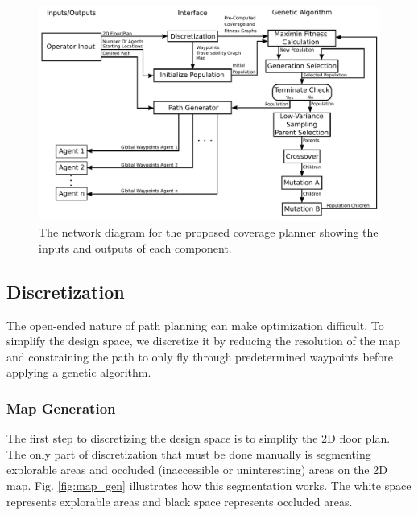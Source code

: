 \documentclass[letterpaper, 10 pt, conference]{ieeeconf}  %
\begin{document}
\begin{figure}
\centering
\includegraphics[width=0.8\linewidth]{coverage_planner_network.pdf}
\caption[The network diagram for the coverage path planner.]{The network diagram for the proposed coverage planner showing the inputs and outputs of each component.}
\label{fig:network}
\end{figure}

\subsection{Discretization}

The open-ended nature of path planning can make optimization difficult. To simplify the design space, we discretize it by reducing the resolution of the map and constraining the path to only fly through predetermined waypoints before applying a genetic algorithm.

\subsubsection{Map Generation}

The first step to discretizing the design space is to simplify the 2D floor plan. The only part of discretization that must be done manually is segmenting explorable areas and occluded (inaccessible or uninteresting) areas on the 2D map. Fig. \ref{fig:map_gen} illustrates how this segmentation works. The white space represents explorable areas and black space represents occluded areas.
\end{document}
